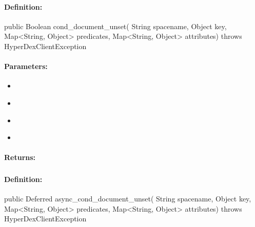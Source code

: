 \paragraph{Definition:}
\begin{javacode}
public Boolean cond_document_unset(
        String spacename,
        Object key,
        Map<String, Object> predicates,
        Map<String, Object> attributes) throws HyperDexClientException
\end{javacode}

\paragraph{Parameters:}
\begin{itemize}[noitemsep]
\item {}\\

\item {}\\

\item {}\\

\item {}\\

\end{itemize}

\paragraph{Returns:}


\pagebreak
\subsubsection{}
\label{api:java:async_cond_document_unset}


\paragraph{Definition:}
\begin{javacode}
public Deferred async_cond_document_unset(
        String spacename,
        Object key,
        Map<String, Object> predicates,
        Map<String, Object> attributes) throws HyperDexClientException
\end{javacode}

